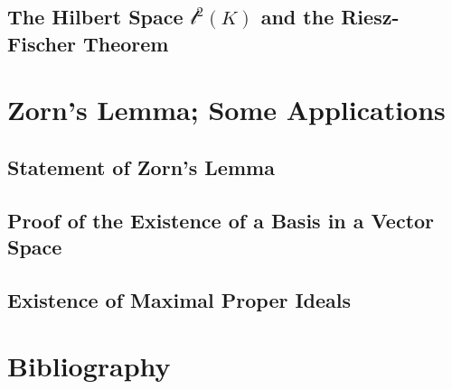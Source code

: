 \documentclass[a4paper]{article}
\begin{document}
\subsection{ The Hilbert Space $\mathcal{l}^2(K)$ and the  Riesz-Fischer Theorem} %


\newpage
\section{Zorn’s Lemma; Some Applications}
\subsection{ Statement of Zorn’s Lemma} %

\subsection{ Proof of the Existence of a Basis in a Vector Space} %

\subsection{ Existence of Maximal Proper Ideals} %


\newpage
\section{Bibliography}
\end{document}

